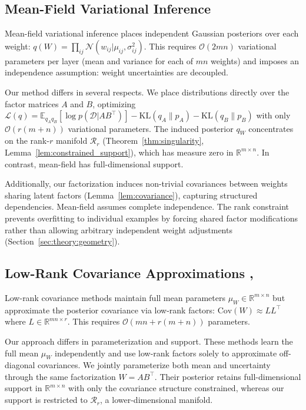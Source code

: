 \documentclass{article}
\theoremstyle{plain}
\theoremstyle{definition}
\theoremstyle{remark}
\begin{document}
\subsection{Mean-Field Variational Inference \cite{blundell2015weight}}

Mean-field variational inference places independent Gaussian posteriors over each weight: $q(W) = \prod_{ij} \mathcal{N}(w_{ij}|\mu_{ij}, \sigma_{ij}^2)$. This requires $\mathcal{O}(2mn)$ variational parameters per layer (mean and variance for each of $mn$ weights) and imposes an independence assumption: weight uncertainties are decoupled.

Our method differs in several respects. We place distributions directly over the factor matrices $A$ and $B$, optimizing $\mathcal{L}(q) = \mathbb{E}_{q_A q_B}[\log p(\mathcal{D}|AB^\top)] - \mathrm{KL}(q_A \| p_A) - \mathrm{KL}(q_B \| p_B)$ with only $\mathcal{O}(r(m+n))$ variational parameters. The induced posterior $q_W$ concentrates on the rank-$r$ manifold $\mathcal{R}_r$ (Theorem~\ref{thm:singularity}, Lemma~\ref{lem:constrained_support}), which has measure zero in $\mathbb{R}^{m \times n}$. In contrast, mean-field has full-dimensional support.

Additionally, our factorization induces non-trivial covariances between weights sharing latent factors (Lemma~\ref{lem:covariance}), capturing structured dependencies. Mean-field assumes complete independence. The rank constraint prevents overfitting to individual examples by forcing shared factor modifications rather than allowing arbitrary independent weight adjustments (Section~\ref{sec:theory:geometry}).

\subsection{Low-Rank Covariance Approximations \cite{swiatkowski2020ktied}, \cite{tomczak2020efficient}}

Low-rank covariance methods maintain full mean parameters $\mu_W \in \mathbb{R}^{m \times n}$ but approximate the posterior covariance via low-rank factors: $\mathrm{Cov}(W) \approx L L^\top$ where $L \in \mathbb{R}^{mn \times r}$. This requires $\mathcal{O}(mn + r(m+n))$ parameters.

Our approach differs in parameterization and support. These methods learn the full mean $\mu_W$ independently and use low-rank factors solely to approximate off-diagonal covariances. We jointly parameterize both mean and uncertainty through the same factorization $W = AB^\top$. Their posterior retains full-dimensional support in $\mathbb{R}^{m \times n}$ with only the covariance structure constrained, whereas our support is restricted to $\mathcal{R}_r$, a lower-dimensional manifold.
\end{document}

